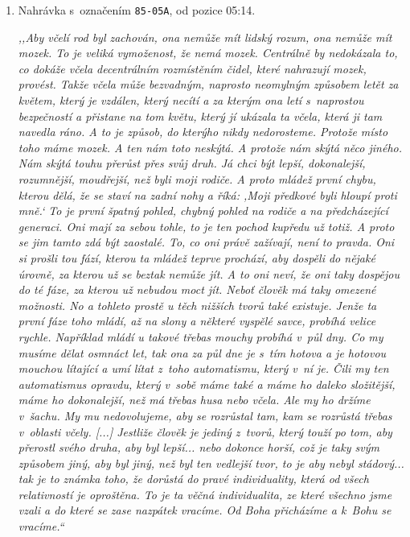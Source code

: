 \begin{enumerate}

\item{
Nahrávka s~označením \texttt{85-05A}, od pozice 05:14.

\textit{%
,,Aby včelí rod byl zachován, ona nemůže mít lidský rozum, ona nemůže mít mozek.
To je veliká vymoženost, že nemá mozek. Centrálně by nedokázala to, co dokáže
včela decentrálním rozmístěním čidel, které nahrazují mozek, provést. Takže
včela může bezvadným, naprosto neomylným způsobem letět za květem, který je
vzdálen, který necítí a za kterým ona letí s~naprostou bezpečností a přistane na
tom květu, který jí ukázala ta včela, která ji tam navedla
ráno. A to je způsob, do kterýho nikdy nedorosteme. Protože místo
toho máme mozek. A ten nám toto neskýtá. A protože nám skýtá něco jiného. Nám
skýtá touhu přerůst přes svůj druh. Já chci být lepší, dokonalejší, rozumnější,
moudřejší, než byli moji rodiče. A proto mládež první chybu, kterou dělá, že se
staví na zadní nohy a říká: ,Moji předkové byli hloupí proti mně.` To je
první špatný pohled, chybný pohled na rodiče a na předcházející generaci.
Oni mají za sebou tohle, to je ten pochod kupředu už totiž. A proto se jim
tamto zdá být zaostalé. To, co oni právě zažívají, není to pravda. Oni si
prošli tou fází, kterou ta mládež teprve prochází, aby dospěli do nějaké úrovně,
za kterou už se beztak nemůže jít. A to oni neví, že oni taky dospějou do té
fáze, za kterou už nebudou moct jít. Neboť člověk má taky omezené možnosti. No a
tohleto prostě u těch nižších tvorů také existuje. Jenže ta první fáze toho
mládí, až na slony a některé vyspělé savce, probíhá velice rychle. Například
mládí u takové třebas mouchy probíhá v~půl dny. Co my musíme dělat
osmnáct let, tak ona za půl dne je s~tím hotova a je hotovou mouchou lítající a
umí lítat z~toho automatismu, který v~ní je. Čili my ten automatismus opravdu,
který v~sobě máme také a máme ho daleko složitější, máme ho
dokonalejší, než má třebas husa nebo včela. Ale my ho držíme v~šachu. My
mu nedovolujeme, aby se rozrůstal tam, kam se rozrůstá třebas v~oblasti
včely.
[...]
Jestliže člověk je jediný z~tvorů, který
touží po tom, aby přerostl svého druha, aby byl lepší... nebo dokonce horší, což
je taky svým způsobem jiný, aby byl jiný, než byl ten vedlejší tvor, to je
aby nebyl stádový... tak je to známka toho, že dorůstá do pravé individuality,
která od všech relativností je oproštěna. To je ta věčná individualita, ze které
všechno jsme vzali a do které se zase nazpátek vracíme. Od Boha přicházíme a
k~Bohu se vracíme.``
}

}
\end{enumerate}
